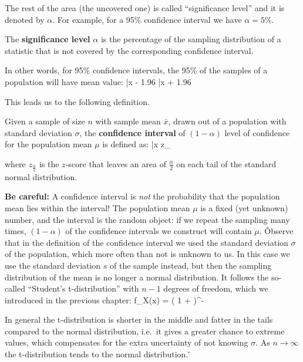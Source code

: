 
The rest of the area (the uncovered one) is called ``significance level'' and it is denoted by $\alpha$. For
example, for a 95\% confidence interval we have $\alpha = 5\%$.

The \textbf{significance level} $\alpha$ is the percentage of the sampling distribution of a statistic that is not
covered by the corresponding confidence interval.
\ed

In other words, for 95\% confidence intervals, the 95\% of the samples of a population will have mean value:
\bse
\bar{x} - 1.96  \leq \mu \leq \bar{x} + 1.96 
\ese

This leads us to the following definition.

Given a sample of size $n$ with sample mean $\bar{x}$, drawn out of a population with standard deviation $\sigma$,
the \textbf{confidence interval} of $(1-\alpha)$ level of confidence for the population mean $\mu$ is defined as:
\bse
\bar{x} \pm z_{} 
\ese

where $z_{\frac{\alpha}{2}}$ is the $z$-score that leaves an area of $\frac{\alpha}{2}$ on each tail of the standard
normal distribution.
\ed

\textbf{Be careful:} A confidence interval is \emph{not} the probability that the population mean lies within the
interval! The population mean $\mu$ is a fixed (yet unknown) number, and the interval is the random object: if we
repeat the sampling many times, $(1-\alpha)$ of the confidence intervals we construct will contain $\mu$. \v

Observe that in the definition of the confidence interval we used the standard deviation $\sigma$ of the population,
which more often than not is unknown to us. In this case we use the standard deviation $s$ of the sample instead,
but then the sampling distribution of the mean is no longer a normal distribution. It follows the so-called
``Student's t-distribution'' with $n-1$ degrees of freedom, which we introduced in the previous chapter:
\bse
f_{X}(x) =  \Big ( 1 +  \Big)^{- }
\ese

In general the t-distribution is shorter in the middle and fatter in the tails compared to the normal distribution,
i.e.\ it gives a greater chance to extreme values, which compensates for the extra uncertainty of not knowing
$\sigma$. As $n \to \infty$ the t-distribution tends to the normal distribution. \v


